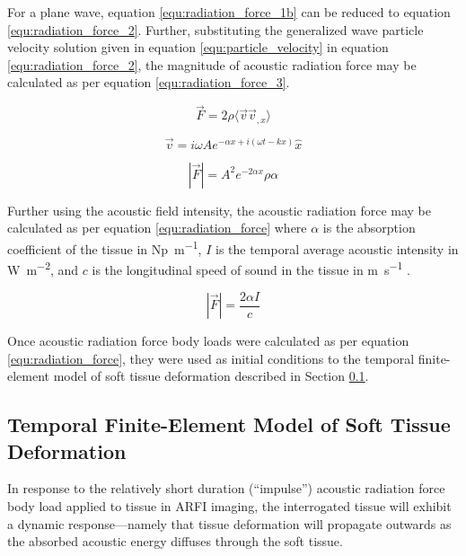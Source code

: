 			For a plane wave, equation \ref{equ:radiation_force_1b} can be reduced to equation \ref{equ:radiation_force_2}. Further, substituting the generalized wave particle velocity solution given in equation \ref{equ:particle_velocity} in equation \ref{equ:radiation_force_2}, the magnitude of acoustic radiation force may be calculated as per equation \ref{equ:radiation_force_3}.

			\begin{equation}
				\label{equ:radiation_force_2}
				\vec{F} = 2\rho\langle \vec{v} \vec{v}_{,x} \rangle
			\end{equation}

			\begin{equation}
				\label{equ:particle_velocity}
				\vec{v} = i\omega A e^{-\alpha x + i\left(\omega t - k x\right)}\hat{x}
			\end{equation}

			\begin{equation}
				\label{equ:radiation_force_3}
				\left|\vec{F}\right| = A^2 e^{-2\alpha x}\rho\alpha
			\end{equation}

			Further using the acoustic field intensity, the acoustic radiation force may be calculated as per equation \ref{equ:radiation_force} where $\alpha$ is the absorption coefficient of the tissue in \si{\neper\per\m}, $I$ is the temporal average acoustic intensity in \si{\W\per\m\squared}, and $c$ is the longitudinal speed of sound in the tissue in \si{\m\per\s} \cite{palmeri05}.

			\begin{equation}
				\label{equ:radiation_force}
				\left|\vec{F}\right| = \frac{2\alpha I}{c}
			\end{equation}

			Once acoustic radiation force body loads were calculated as per equation \ref{equ:radiation_force}, they were used as initial conditions to the temporal finite-element model of soft tissue deformation described in Section \ref{subsec:temporal_fea_arfi}.

		\subsection{Temporal Finite-Element Model of Soft Tissue Deformation}
			\label{subsec:temporal_fea_arfi}
			In response to the relatively short duration (``impulse'') acoustic radiation force body load applied to tissue in ARFI imaging, the interrogated tissue will exhibit a dynamic response---namely that tissue deformation will propagate outwards as the absorbed acoustic energy diffuses through the soft tissue.

